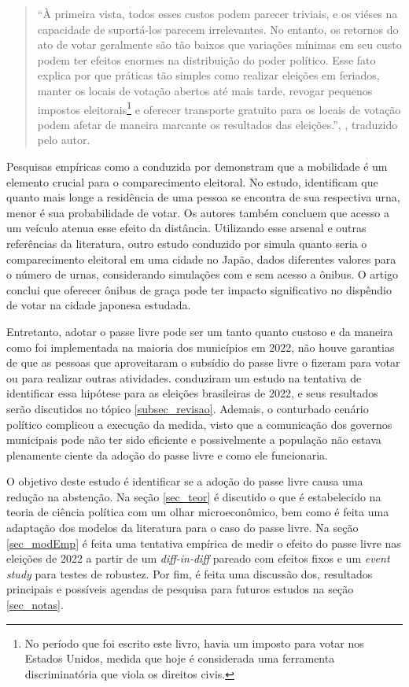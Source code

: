 \begin{quote}
  ``À primeira vista, todos esses custos podem parecer triviais, e os viéses na capacidade de suportá-los parecem irrelevantes. No entanto, os retornos do ato de votar geralmente são tão baixos que variações mínimas em seu custo podem ter efeitos enormes na distribuição do poder político. Esse fato explica por que práticas tão simples como realizar eleições em feriados, manter os locais de votação abertos até mais tarde, revogar pequenos impostos eleitorais\footnote{No período que foi escrito este livro, havia um imposto para votar nos Estados Unidos, medida que hoje é considerada uma ferramenta discriminatória que viola os direitos civis.} 
  e oferecer transporte gratuito para os locais de votação podem afetar de maneira marcante os resultados das eleições.'', \textcite{downs1957economic}, traduzido pelo autor.
\end{quote}

Pesquisas empíricas como a conduzida por \textcite{haspel2005location} demonstram que a mobilidade é um elemento crucial para o comparecimento eleitoral. No estudo, identificam que quanto mais longe a residência de uma pessoa se encontra de sua respectiva urna, menor é sua probabilidade de votar. Os autores também concluem que acesso a um veículo atenua esse efeito da distância. Utilizando esse arsenal e outras referências da literatura, outro estudo conduzido por \textcite{konishi2010examination} simula quanto seria o comparecimento eleitoral em uma cidade no Japão, dados diferentes valores para o número de urnas, considerando simulações com e sem acesso a ônibus. O artigo conclui que oferecer ônibus de graça pode ter impacto significativo no dispêndio de votar na cidade japonesa estudada.

Entretanto, adotar o passe livre pode ser um tanto quanto custoso e da maneira como foi implementada na maioria dos municípios em 2022, não houve garantias de que as pessoas que aproveitaram o subsídio do passe livre o fizeram para votar ou para realizar outras atividades. \textcite{pereira2023transporte} conduziram um estudo na tentativa de identificar essa hipótese para as eleições brasileiras de 2022, e seus resultados serão discutidos no tópico \ref{subsec_revisao}. Ademais, o conturbado cenário político complicou a execução da medida, visto que a comunicação dos governos municipais pode não ter sido eficiente e possivelmente a população não estava plenamente ciente da adoção do passe livre e como ele funcionaria. 

O objetivo deste estudo é identificar se a adoção do passe livre causa uma redução na abstenção. Na seção \ref{sec_teor} é discutido o que é estabelecido na teoria de ciência política com um olhar microeconômico, bem como é feita uma adaptação dos modelos da literatura para o caso do passe livre. Na seção \ref{sec_modEmp} é feita uma tentativa empírica de medir o efeito do passe livre nas eleições de 2022 a partir de um \textit{diff-in-diff} pareado com efeitos fixos e um \textit{event study} para testes de robustez. Por fim, é feita uma discussão dos, resultados principais e possíveis agendas de pesquisa para futuros estudos na seção \ref{sec_notas}.

